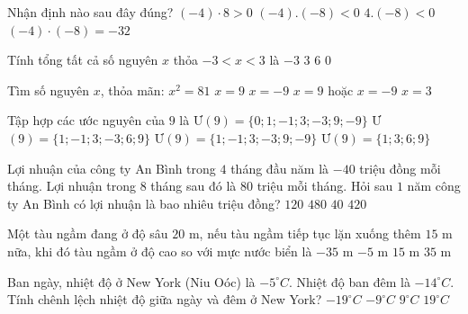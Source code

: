 \begin{ex}%
	Nhận định nào sau đây đúng?
	\choice
	{$(-4) \cdot 8>0$}
	{$(-4) .(-8)<0$}
	{\True $4 .(-8)<0$}
	{$(-4) \cdot(-8)=-32$}
\end{ex}


\begin{ex}
	Tính tổng tất cả số nguyên $x$ thỏa $-3<x<3$ là
	\choice
	{$-3$}
	{$3$}
	{$6$}
	{\True $0$}
\end{ex}

\begin{ex} Tìm số nguyên $x$, thỏa mãn: $x^2=81$
	\choice
	{$x=9$}
	{$x=-9$}
	{\True $x=9$ hoặc $x=-9$}
	{$x=3$}
\end{ex}	
\begin{ex}
	Tập hợp các ước nguyên của $9$ là	
	\choice
	{Ư$(9) = \{0; 1; -1; 3; -3; 9; -9\}$}
	{Ư$(9) = \{ 1; -1; 3; -3; 6; 9\}$}
	{\True Ư$(9) = \{ 1; -1; 3; -3; 9; -9\}$}
	{Ư$(9) = \{1; 3; 6; 9\}$}	
\end{ex}

\begin{ex}
	Lợi nhuận của công ty An Bình trong $4$ tháng đầu năm là $-40$ triệu đồng mỗi tháng. Lợi nhuận trong $8$ tháng sau đó là $80$ triệu mỗi tháng. Hỏi sau $1$ năm công ty An Bình có lợi nhuận là bao nhiêu triệu đồng?
	\choice
	{$120$} 
	{\True $480$}
	{$40$} 
	{$420$}
\end{ex}

\begin{ex}
	Một tàu ngầm đang ở độ sâu $20$ m, nếu tàu ngầm tiếp tục lặn xuống thêm $15$ m nữa, khi đó tàu ngầm ở độ cao so với mực nước biển là
	\choice
	{\True $-35$ m}
	{$-5$ m}
	{$15$ m}
	{$35$ m}
\end{ex}


\begin{ex} %
	Ban ngày, nhiệt độ ở New York (Niu Oóc) là $-5^{\circ} {C}$. Nhiệt độ ban đêm là $-14^{\circ} {C}$. Tính chênh lệch nhiệt độ giữa ngày và đêm ở New York?
	\choice
	{$-19^{\circ} {C}$}
	{$-9^{\circ} {C}$}
	{\True $9^{\circ} {C}$}
	{$19^{\circ} {C}$}
\end{ex}




